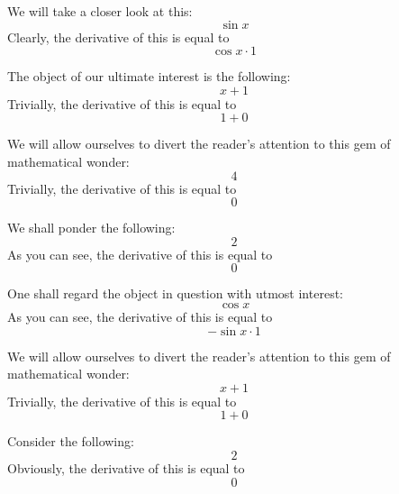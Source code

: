 \documentclass{article}
\begin{document}
We will take a closer look at this:
\begin{equation}
\sin x 
\end{equation}
Clearly, the derivative of this is equal to
\begin{equation}
\cos x \cdot 1 
\end{equation}

The object of our ultimate interest is the following:
\begin{equation}
x + 1 
\end{equation}
Trivially, the derivative of this is equal to
\begin{equation}
1 + 0 
\end{equation}

We will allow ourselves to divert the reader's attention to this gem of mathematical wonder:
\begin{equation}
4 
\end{equation}
Trivially, the derivative of this is equal to
\begin{equation}
0 
\end{equation}

We shall ponder the following:
\begin{equation}
2 
\end{equation}
As you can see, the derivative of this is equal to
\begin{equation}
0 
\end{equation}

One shall regard the object in question with utmost interest:
\begin{equation}
\cos x 
\end{equation}
As you can see, the derivative of this is equal to
\begin{equation}
-\sin x \cdot 1 
\end{equation}

We will allow ourselves to divert the reader's attention to this gem of mathematical wonder:
\begin{equation}
x + 1 
\end{equation}
Trivially, the derivative of this is equal to
\begin{equation}
1 + 0 
\end{equation}

Consider the following:
\begin{equation}
2 
\end{equation}
Obviously, the derivative of this is equal to
\begin{equation}
0 
\end{equation}
\end{document}
